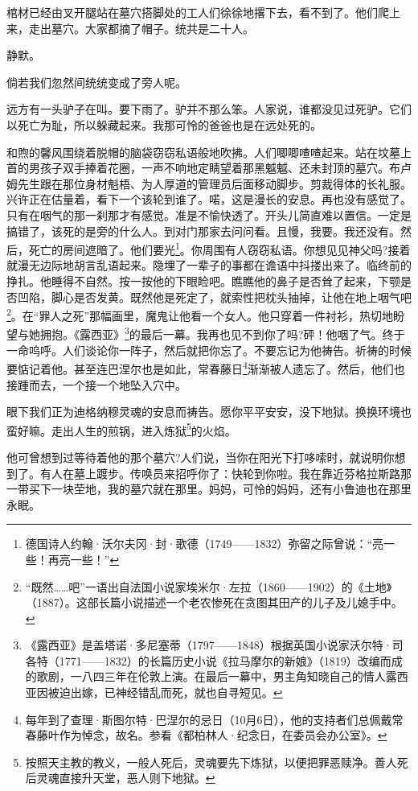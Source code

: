 \par 棺材已经由叉开腿站在墓穴搭脚处的工人们徐徐地撂下去，看不到了。他们爬上来，走出墓穴。大家都摘了帽子。统共是二十人。
\par 静默。
\par 倘若我们忽然间统统变成了旁人呢。
\par 远方有一头驴子在叫。要下雨了。驴并不那么笨。人家说，谁都没见过死驴。它们以死亡为耻，所以躲藏起来。我那可怜的爸爸也是在远处死的。
\par 和煦的馨风围绕着脱帽的脑袋窃窃私语般地吹拂。人们唧唧喳喳起来。站在坟墓上首的男孩子双手捧着花圈，一声不响地定睛望着那黑魆魆、还未封顶的墓穴。布卢姆先生跟在那位身材魁梧、为人厚道的管理员后面移动脚步。剪裁得体的长礼服。兴许正在估量着，看下一个该轮到谁了。喏，这是漫长的安息。再也没有感觉了。只有在咽气的那一刹那才有感觉。准是不愉快透了。开头儿简直难以置信。一定是搞错了，该死的是旁的什么人。到对门那家去问问看。且慢，我要。我还没有。然后，死亡的房间遮暗了。他们要光\footnote{德国诗人约翰·沃尔夫冈·封·歌德（1749——1832）弥留之际曾说：“亮一些！再亮一些！”}。你周围有人窃窃私语。你想见见神父吗?接着就漫无边际地胡言乱语起来。隐埋了一辈子的事都在谵语中抖搂出来了。临终前的挣扎。他睡得不自然。按一按他的下眼睑吧。瞧瞧他的鼻子是否耸了起来，下颚是否凹陷，脚心是否发黄。既然他是死定了，就索性把枕头抽掉，让他在地上咽气吧\footnote{“既然……吧”一语出自法国小说家埃米尔·左拉（1860——1902）的《土地》（1887）。这部长篇小说描述一个老农惨死在贪图其田产的儿子及儿媳手中。}。在“罪人之死”那幅画里，魔鬼让他看一个女人。他只穿着一件衬衫，热切地盼望与她拥抱。《露西亚》\footnote{《露西亚》是盖塔诺·多尼塞蒂（1797——1848）根据英国小说家沃尔特·司各特（1771——1832）的长篇历史小说《拉马摩尔的新娘》（1819）改编而成的歌剧，一八四三年在伦敦上演。在最后一幕中，男主角知晓自己的情人露西亚因被迫出嫁，已神经错乱而死，就也自寻短见。}的最后一幕。我再也见不到你了吗?砰！他咽了气。终于一命呜呼。人们谈论你一阵子，然后就把你忘了。不要忘记为他祷告。祈祷的时候要惦记着他。甚至连巴涅尔也是如此，常春藤日\footnote{每年到了查理·斯图尔特·巴涅尔的忌日（10月6日），他的支持者们总佩戴常春藤叶作为悼念，故名。参看《都柏林人·纪念日，在委员会办公室》。}渐渐被人遗忘了。然后，他们也接踵而去，一个接一个地坠入穴中。
\par 眼下我们正为迪格纳穆灵魂的安息而祷告。愿你平平安安，没下地狱。换换环境也蛮好嘛。走出人生的煎锅，进入炼狱\footnote{按照天主教的教义，一般人死后，灵魂要先下炼狱，以便把罪恶赎净。善人死后灵魂直接升天堂，恶人则下地狱。}的火焰。
\par 他可曾想到过等待着他的那个墓穴?人们说，当你在阳光下打哆嗦时，就说明你想到了。有人在墓上踱步。传唤员来招呼你了：快轮到你啦。我在靠近芬格拉斯路那一带买下一块茔地，我的墓穴就在那里。妈妈，可怜的妈妈，还有小鲁迪也在那里永眠。
